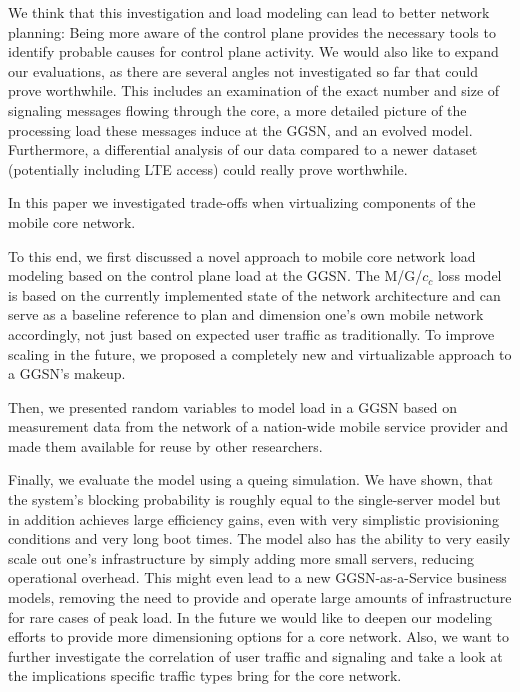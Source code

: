 We think that this investigation and load modeling can lead to better network planning: Being more aware of the control plane provides the necessary tools to identify probable causes for control plane activity. We would also like to expand our evaluations, as there are several angles not investigated so far that could prove worthwhile. This includes an examination of the exact number and size of signaling messages flowing through the core, a more detailed picture of the processing load these messages induce at the \gls{GGSN}, and an evolved model. Furthermore, a differential analysis of our data compared to a newer dataset (potentially including \gls{LTE} access) could really prove worthwhile.



In this paper we investigated trade-offs when virtualizing components of the mobile core network.

To this end, we first discussed a novel approach to mobile core network load modeling based on the control plane load at the \gls{GGSN}. The M/G/$c_c$ loss model is based on the currently implemented state of the network architecture and can serve as a baseline reference to plan and dimension one's own mobile network accordingly, not just based on expected user traffic as traditionally. To improve scaling in the future, we proposed a completely new and virtualizable approach to a \gls{GGSN}'s makeup.

Then, we presented random variables to model load in a \gls{GGSN} based on measurement data from the network of a nation-wide mobile service provider and made them available for reuse by other researchers.

Finally, we evaluate the model using a queing simulation. We have shown, that the system's blocking probability is roughly equal to the single-server model but in addition achieves large efficiency gains, even with very simplistic provisioning conditions and very long boot times. The model also has the ability to very easily scale out one's infrastructure by simply adding more small servers, reducing operational overhead. This might even lead to a new GGSN-as-a-Service business models, removing the need to provide and operate large amounts of infrastructure for rare cases of peak load. 
In the future we would like to deepen our modeling efforts to provide more dimensioning options for a core network. Also, we want to further investigate the correlation of user traffic and signaling and take a look at the implications specific traffic types bring for the core network. 